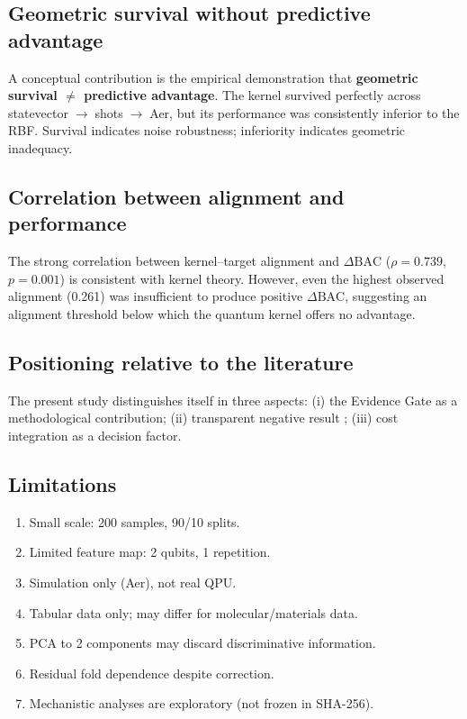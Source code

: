 \documentclass[11pt,a4paper]{article}
\newcommand{\BAC}{\mathrm{BAC}}
\begin{document}
\subsection{Geometric survival without predictive advantage}
\label{ssec:disc_survival}

A conceptual contribution is the empirical demonstration that
\textbf{geometric survival $\neq$ predictive advantage}. The kernel survived
perfectly across statevector$\;\to\;$shots$\;\to\;$Aer, but its performance
was consistently inferior to the RBF. Survival indicates noise robustness;
inferiority indicates geometric inadequacy.

\subsection{Correlation between alignment and performance}
\label{ssec:disc_alignment}

The strong correlation between kernel--target alignment and $\Delta\BAC$
($\rho = 0.739$, $p = 0.001$) is consistent with kernel theory. However, even
the highest observed alignment (0.261) was insufficient to produce positive
$\Delta\BAC$, suggesting an alignment threshold below which the quantum kernel
offers no advantage.

\subsection{Positioning relative to the literature}
\label{ssec:disc_positioning}

The present study distinguishes itself in three aspects: (i) the Evidence Gate
as a methodological contribution; (ii) transparent negative result
\citep{scheel2022role}; (iii) cost integration as a decision factor.

\subsection{Limitations}
\label{ssec:limitations}

\begin{enumerate}[label=(\roman*)]
  \item Small scale: 200 samples, 90/10 splits.
  \item Limited feature map: 2 qubits, 1 repetition.
  \item Simulation only (Aer), not real QPU.
  \item Tabular data only; may differ for molecular/materials data.
  \item PCA to 2 components may discard discriminative information.
  \item Residual fold dependence despite correction.
  \item Mechanistic analyses are exploratory (not frozen in SHA-256).
\end{enumerate}
\end{document}

